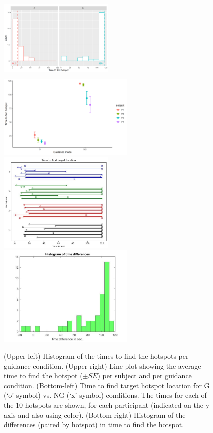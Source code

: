 \documentclass[runningheads]{res/templates/llncs}
\begin{document}
\begin{figure}
\includegraphics[width=5.5cm, height=4.1cm,]{res/img/histNG.png}
\includegraphics[width=6.5cm, keepaspectratio,]{res/img/lines.png}
\includegraphics[width=5.5cm, keepaspectratio,]{res/img/fig2a.jpg}
\includegraphics[width=6.5cm, keepaspectratio,]{res/img/fig2b.jpg}
\caption{
(Upper-left) Histogram of the times to find the hotspots per guidance condition. 
(Upper-right) Line plot showing the average time to find the hotspot ($\pm{ SE}$) per subject and per guidance condition. 
(Bottom-left) Time to find target hotspot location for G (‘o’ symbol) vs. NG  (‘x’ symbol) conditions. The times for each of the 10 hotspots are shown, for each participant (indicated on the y axis and also using color). 
(Bottom-right) Histogram of the differences (paired by hotspot) in time to find the hotspot.}
\label{fig:res}
\end{figure}
\end{document}
